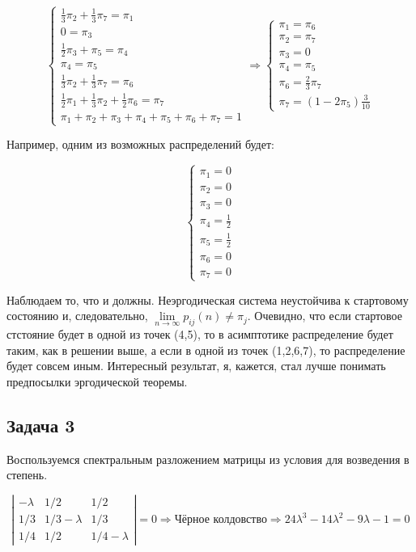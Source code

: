 \documentclass[a4paper,12pt]{article}
\begin{document}
\[ \begin{cases} 
\frac{1}{3}\pi_2 + \frac{1}{3}\pi_7 = \pi_1\\
0 = \pi_3\\
\frac{1}{2}\pi_3 + \pi_5 = \pi_4\\
\pi_4 = \pi_5\\
\frac{1}{3}\pi_2 + \frac{1}{3}\pi_7 = \pi_6\\
\frac{1}{2}\pi_1 + \frac{1}{3}\pi_2 + \frac{1}{2}\pi_6 = \pi_7\\
\pi_1 + \pi_2 + \pi_3 + \pi_4 + \pi_5 + \pi_6 + \pi_7 = 1
\end{cases} \Rightarrow \begin{cases}
\pi_1 = \pi_6\\
\pi_2 = \pi_7\\
\pi_3 = 0\\
\pi_4 = \pi_5\\
\pi_6 = \frac{2}{3}\pi_7\\
\pi_7 = (1-2\pi_5)\frac{3}{10}
\end{cases}\]



Например, одним из возможных распределений будет:

\[ \begin{cases}
\pi_1 = 0\\
\pi_2 = 0\\
\pi_3 = 0\\
\pi_4 = \frac{1}{2}\\
\pi_5 = \frac{1}{2}\\
\pi_6 = 0\\
\pi_7 = 0
\end{cases} \]

Наблюдаем то, что и должны. Неэргодическая система неустойчива к стартовому состоянию и, следовательно, $ \lim\limits_{n \to \infty} p_{ij}(n) \neq \pi_{j} $. Очевидно, что если стартовое стстояние будет в одной из точек (4,5), то в асимптотике распределение будет таким, как в решении выше, а если в одной из точек (1,2,6,7), то распределение будет совсем иным. Интересный результат, я, кажется, стал лучше понимать предпосылки эргодической теоремы.

\subsection{Задача 3}

Воспользуемся спектральным разложением матрицы из условия для возведения в степень.

\[
\left|\begin{array}{ccc}{-\lambda} & {1 / 2} & {1 / 2} \\ {1 / 3} & {1 / 3 - \lambda} & {1 / 3} \\ {1 / 4} & {1 / 2} & {1 / 4 - \lambda}\end{array}\right| = 0 \Rightarrow \text{Чёрное колдовство} \Rightarrow 24 \lambda^3 - 14\lambda^2 - 9\lambda - 1 = 0
\]
\end{document}
